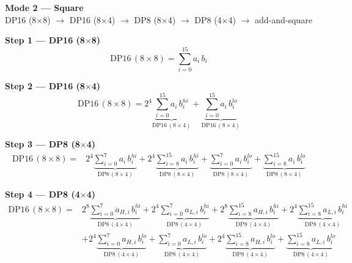 \documentclass[fleqn]{article}
\newcommand{\DPop}[3]{\mathrm{DP#1}\,(#2\!\times\!#3)}
\begin{document}
\begin{center}
{\LARGE \textbf{Mode 2 --- Square}}\\[4pt]
{\large DP16 (8$\times$8) $\rightarrow$ DP16 (8$\times$4) $\rightarrow$ DP8 (8$\times$4) $\rightarrow$ DP8 (4$\times$4) $\rightarrow$ add-and-square}
\end{center}

\vspace{0.1em}

\textbf{Step 1 --- DP16 (8$\times$8)}
\[
\DPop{16}{8}{8} = \sum_{i=0}^{15} a_i \, b_i
\]

\textbf{Step 2 --- DP16 (8$\times$4)}
\[
\DPop{16}{8}{8}
  = 2^{4}\underbrace{\sum_{i=0}^{15} a_i \, b_i^{hi}}_{\DPop{16}{8}{4}}
  + \underbrace{\sum_{i=0}^{15} a_i \, b_i^{lo}}_{\DPop{16}{8}{4}}
\]

\textbf{Step 3 --- DP8 (8$\times$4)}
\begin{align*}
\DPop{16}{8}{8} = {}
  & 2^{4}\underbrace{\sum_{i=0}^{7} a_i \, b_i^{hi}}_{\DPop{8}{8}{4}}
  + 2^{4}\underbrace{\sum_{i=8}^{15} a_i \, b_i^{hi}}_{\DPop{8}{8}{4}}
  + \underbrace{\sum_{i=0}^{7} a_i \, b_i^{lo}}_{\DPop{8}{8}{4}}
  + \underbrace{\sum_{i=8}^{15} a_i \, b_i^{lo}}_{\DPop{8}{8}{4}}
\end{align*}

\textbf{Step 4 --- DP8 (4$\times$4)}
\begin{align*}
\DPop{16}{8}{8} = {}
  & 2^{8}\underbrace{\sum_{i=0}^{7} a_{H,i}\, b_i^{hi}}_{\DPop{8}{4}{4}}
  + 2^{4}\underbrace{\sum_{i=0}^{7} a_{L,i}\, b_i^{hi}}_{\DPop{8}{4}{4}}
  + 2^{8}\underbrace{\sum_{i=8}^{15} a_{H,i}\, b_i^{hi}}_{\DPop{8}{4}{4}}
  + 2^{4}\underbrace{\sum_{i=8}^{15} a_{L,i}\, b_i^{hi}}_{\DPop{8}{4}{4}} \\[0.6em]
  & + 2^{4}\underbrace{\sum_{i=0}^{7} a_{H,i}\, b_i^{lo}}_{\DPop{8}{4}{4}}
  + \underbrace{\sum_{i=0}^{7} a_{L,i}\, b_i^{lo}}_{\DPop{8}{4}{4}}
  + 2^{4}\underbrace{\sum_{i=8}^{15} a_{H,i}\, b_i^{lo}}_{\DPop{8}{4}{4}}
  + \underbrace{\sum_{i=8}^{15} a_{L,i}\, b_i^{lo}}_{\DPop{8}{4}{4}}
\end{align*}
\end{document}
